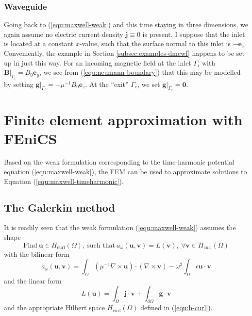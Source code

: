 \documentclass[11pt, a4paper]{article}
\begin{document}
\subsubsection{Waveguide}
\label{subsubsec:waveguide}

Going back to (\ref{equ:maxwell-weak}) and this time staying in three dimensions,
we again assume no electric current density $\mathbf{j} \equiv 0$ is present.
I suppose that the inlet is located at a constant $x$-value,
such that the surface normal to this inlet is $-\mathbf{e}_x$. Conveniently, the example 
in Section \ref{subsec:examples-dmcwf} happens to be set up in just this way. For an incoming
magnetic field at the inlet $\Gamma_i$ with $\left.\mathbf{B}\right|_{\Gamma_i} = B_0 \mathbf{e}_y$,
we see from (\ref{equ:neumann-boundary}) that this may be modelled by setting
$\left.\mathbf{g}\right|_{\Gamma_i} = - \mu^{-1} B_0 \mathbf{e}_z$.
At the \enquote{exit} $\Gamma_e$, we set $\left.\mathbf{g}\right|_{\Gamma_e} = \boldsymbol{0}$.

\newpage
\section{Finite element approximation with FEniCS}
\label{sec:fem}

Based on the weak formulation corresponding to the time-harmonic potential equation
(\ref{equ:maxwell-weak}), the \acrfull{FEM} can be used to approximate solutions 
to Equation (\ref{equ:maxwell-timeharmonic}).

\subsection{The Galerkin method}
\label{subsec:fem-theory}

It is readily seen that the weak formulation (\ref{equ:maxwell-weak}) assumes the shape
\begin{equation}
    \text{Find}~\mathbf{u} \in H_{\textrm{curl}}(\Omega),~\text{such that}~a_{\omega}(\mathbf{u}, \mathbf{v}) = L(\mathbf{v}), ~\forall \mathbf{v} \in H_{\textrm{curl}}(\Omega)
\end{equation}
with the bilinear form 
\begin{equation}
    a_{\omega}(\mathbf{u}, \mathbf{v}) = \int_{\Omega} (\mu^{-1} \nabla \times \mathbf{u}) \cdot (\nabla \times \mathbf{v})
    - \omega^2 \int_{\Omega} \epsilon \mathbf{u} \cdot \mathbf{v} \label{equ:bilinear-form}
\end{equation}
and the linear form 
\begin{equation}
    L(\mathbf{u}) = \int_{\Omega} \mathbf{j} \cdot \mathbf{v} + \int_{\partial \Omega} \mathbf{g} \cdot \mathbf{v} \label{equ:linear-form}
\end{equation}
and the appropriate Hilbert space $H_{\textrm{curl}}(\Omega)$ defined in (\ref{equ:h-curl}).
\end{document}
